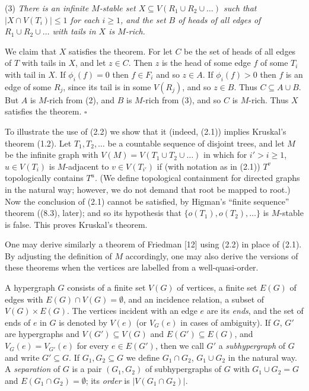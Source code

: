 \hspace*{12pt}(3) \textit{There is an infinite $M$-stable set $X \subseteq V(R_1 \cup R_2 \cup \dots)$ such that $|X \cap V(T_i)| \le 1$ for each $i \ge 1$, and the set $B$ of heads of all edges of $R_1 \cup R_2 \cup \dots$ with tails in $X$ is $M$-rich.}

We claim that $X$ satisfies the theorem. For let $C$ be the set of heads of all edges of $T$ with tails in $X$, and let $z \in C$. Then $z$ is the head of some edge $f$ of some $T_i$ with tail in $X$. If $\phi_i(f) = 0$ then $f \in F_i$ and so $z \in A$. If $\phi_i(f) > 0$ then $f$ is an edge of some $R_j$, since its tail is in some $V(R_j)$, and so $z \in B$. Thus $C \subseteq A \cup B$. But $A$ is $M$-rich from (2), and $B$ is $M$-rich from (3), and so $C$ is $M$-rich. Thus $X$ satisfies the theorem. $\square$

To illustrate the use of (2.2) we show that it (indeed, (2.1)) implies Kruskal's theorem (1.2). Let $T_1, T_2, \dots$ be a countable sequence of disjoint trees, and let $M$ be the infinite graph with $V(M) = V(T_1 \cup T_2 \cup \dots)$ in which for $i' > i \ge 1$, $u \in V(T_i)$ is $M$-adjacent to $v \in V(T_{i'})$ if (with notation as in (2.1)) $T^v$ topologically contains $T^u$. (We define topological containment for directed graphs in the natural way; however, we do not demand that root be mapped to root.) Now the conclusion of (2.1) cannot be satisfied, by Higman's ``finite sequence'' theorem ((8.3), later); and so its hypothesis that $\{o(T_1), o(T_2), \dots\}$ is $M$-stable is false. This proves Kruskal's theorem.

One may derive similarly a theorem of Friedman [12] using (2.2) in place of (2.1). By adjusting the definition of $M$ accordingly, one may also derive the versions of these theorems when the vertices are labelled from a well-quasi-order.


A hypergraph $G$ consists of a finite set $V(G)$ of vertices, a finite set $E(G)$ of edges with $E(G) \cap V(G) = \emptyset$, and an incidence relation, a subset of $V(G) \times E(G)$. The vertices incident with an edge $e$ are its \textit{ends}, and the set of ends of $e$ in $G$ is denoted by $V(e)$ (or $V_G(e)$ in cases of ambiguity). If $G$, $G'$ are hypergraphs and $V(G') \subseteq V(G)$ and $E(G') \subseteq E(G)$, and $V_G(e) = V_{G'}(e)$ for every $e \in E(G')$, then we call $G'$ a \textit{subhypergraph} of $G$ and write $G' \subseteq G$. If $G_1, G_2 \subseteq G$ we define $G_1 \cap G_2$, $G_1 \cup G_2$ in the natural way. A \textit{separation} of $G$ is a pair $(G_1, G_2)$ of subhypergraphs of $G$ with $G_1 \cup G_2 = G$ and $E(G_1 \cap G_2) = \emptyset$; its \textit{order} is $|V(G_1 \cap G_2)|$.

